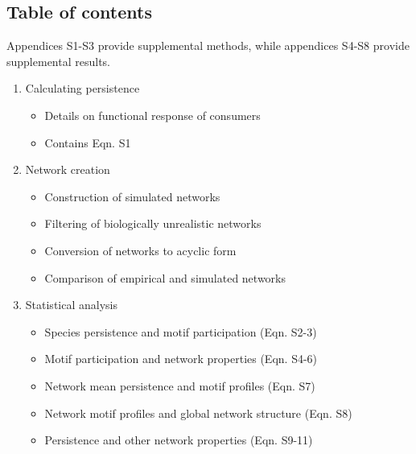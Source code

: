 \documentclass[12pt]{article}
\begin{document}
\setlength{\parindent}{15pt} 
\begin{spacing}{2.0}

\clearpage

\section*{Table of contents}
    \begin{spacing}{1.0}

    Appendices S1-S3 provide supplemental methods, while appendices S4-S8 provide supplemental results.

    \begin{enumerate}
    
        \item Calculating persistence

            \begin{itemize}
                \item Details on functional response of consumers
                \item Contains Eqn. S1
            \end{itemize}    
            

        \item Network creation \\
        
            \begin{itemize}
            \item Construction of simulated networks
            \item Filtering of biologically unrealistic networks 
            \item Conversion of networks to acyclic form
            \item Comparison of empirical and simulated networks
            \end{itemize}
            
            
        \item Statistical analysis

            \begin{itemize}
                \item Species persistence and motif participation (Eqn. S2-3)
                \item Motif participation and network properties (Eqn. S4-6)
                \item Network mean persistence and motif profiles (Eqn. S7)
                \item Network motif profiles and global network structure (Eqn. S8)
                \item Persistence and other network properties (Eqn. S9-11)
            \end{itemize}
                


\end{enumerate}
\end{spacing}
\end{spacing}
\end{document}
